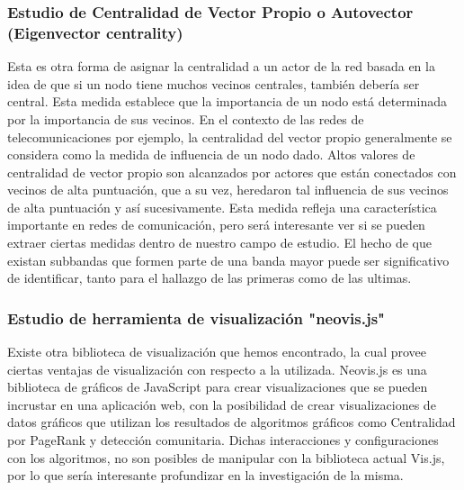 \subsubsection{Estudio de Centralidad de Vector Propio o Autovector (Eigenvector centrality)} Esta es otra forma de asignar la centralidad a un actor de la red basada en la idea de que si un nodo tiene muchos vecinos centrales, también debería ser central. Esta medida establece que la importancia de un nodo está determinada por la importancia de sus vecinos. En el contexto de las redes de telecomunicaciones por ejemplo, la centralidad del vector propio generalmente se considera como la medida de influencia de un nodo dado. Altos valores de centralidad de vector propio son alcanzados por actores que están conectados con vecinos de alta puntuación, que a su vez, heredaron tal influencia de sus vecinos de alta puntuación y así sucesivamente. Esta medida refleja una característica importante en redes de comunicación, pero será interesante ver si se pueden extraer ciertas medidas dentro de nuestro campo de estudio. El hecho de que existan subbandas que formen parte de una banda mayor puede ser significativo de identificar, tanto para el hallazgo de las primeras como de las ultimas. 

\subsubsection{Estudio de herramienta de visualización "neovis.js"} Existe otra biblioteca de visualización que hemos encontrado, la cual provee ciertas ventajas de visualización con respecto a la utilizada. Neovis.js es una biblioteca de gráficos de JavaScript para crear visualizaciones que se pueden incrustar en una aplicación web, con la posibilidad de crear visualizaciones de datos gráficos que utilizan los resultados de algoritmos gráficos como Centralidad por PageRank y detección comunitaria. Dichas interacciones y configuraciones con los algoritmos, no son posibles de manipular con la biblioteca actual Vis.js, por lo que sería interesante profundizar en la investigación de la misma. 